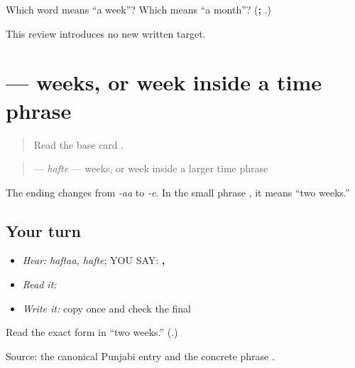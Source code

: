 \begin{tcolorbox}[breakable,colback=teal!4,colframe=teal!35!black,title={Before you move on}]
Which word means “a week”? Which means “a month”? (\textbf{; }.)

This review introduces no new written target.
\end{tcolorbox}
\section[\texorpdfstring{\pa{ਹਫ਼ਤੇ} (hafte)}{ਹਫ਼ਤੇ (hafte)}]{ — weeks, or week inside a time phrase}

\label{lesson:PA-C184-hafte}



\begin{quote}
Read the base card \textbf{}.
\end{quote}

\begin{grammarlens}[title={Grammar Lens: change the final vowel}]
\begin{quote}
\textbf{} — \emph{hafte} — weeks, or week inside a larger time phrase
\end{quote}

The ending changes from \emph{-aa} to \emph{-e}. In the small phrase \textbf{ }, it means “two weeks.”
\end{grammarlens}

\subsection*{Your turn}
\begin{itemize}
\raggedright
  \item \emph{Hear:} \emph{haftaa, hafte}; YOU SAY: \textbf{, }
  \item \emph{Read it:} \textbf{ }
  \item \emph{Write it:} copy \textbf{} once and check the final \textbf{}
\end{itemize}

\begin{tcolorbox}[breakable,colback=teal!4,colframe=teal!35!black,title={Before you move on}]
Read the exact form in “two weeks.” (\textbf{}.)

Source: the canonical Punjabi \textbf{} entry and the concrete phrase \textbf{ }.
\end{tcolorbox}
